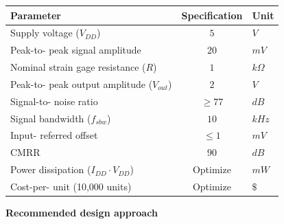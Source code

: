 \documentclass[11pt]{article}
\begin{document}
\begin{center}
\renewcommand{\arraystretch}{1.8}
\begin{tabular}{p{3.5cm} c l}
\textbf{Parameter} & \textbf{Specification} & \textbf{Unit} \\
\hline
Supply \newline voltage \newline ($V_{DD}$) & $5$ & $V$ \\
Peak-to- \newline peak signal \newline amplitude & $20$ & $mV$ \\
Nominal \newline strain gage \newline resistance \newline ($R$) & $1$ & $k\Omega$ \\
Peak-to- \newline peak output \newline amplitude \newline ($V_{out}$) & $2$ & $V$ \\
Signal-to- \newline noise ratio & $\ge 77$ & $dB$ \\
Signal \newline bandwidth \newline ($f_{sbw}$) & $10$ & $kHz$ \\
Input- \newline referred \newline offset & $\le 1$ & $mV$ \\
CMRR & $90$ & $dB$ \\
Power \newline dissipation \newline ($I_{DD} \cdot V_{DD}$) & Optimize & $mW$ \\
Cost-per- \newline unit (10,000 \newline units) & Optimize & $\$$ \\
\end{tabular}
\end{center}

\vspace{2em}
\textbf{\Large Recommended design approach}
\end{document}
